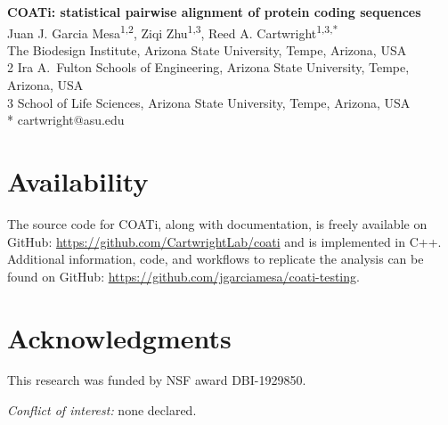 



\begin{flushleft}
{\Large\textbf{COATi: statistical pairwise alignment of protein coding sequences}}
\newline
\\
Juan J. Garcia Mesa\textsuperscript{1,2},
Ziqi Zhu\textsuperscript{1,3},
Reed A. Cartwright\textsuperscript{1,3,*}
\\
 The Biodesign Institute, Arizona State University, Tempe, Arizona, USA
\\
2 Ira A.\ Fulton Schools of Engineering, Arizona State University, Tempe, Arizona, USA
\\
3 School of Life Sciences, Arizona State University, Tempe, Arizona, USA
\\
\bigskip
* cartwright@asu.edu

\end{flushleft}



\linenumbers







\section*{Availability}
The source code for COATi, along with documentation, is freely available on GitHub: \url{https://github.com/CartwrightLab/coati} and is implemented in C++. Additional information, code, and workflows to replicate the analysis can be found on GitHub: \url{https://github.com/jgarciamesa/coati-testing}.


\section*{Acknowledgments}

This research was funded by NSF award DBI-1929850.

\noindent \textit{Conflict of interest:} none declared.

%
\setlength{\bibhang}{0pt}


\nolinenumbers


